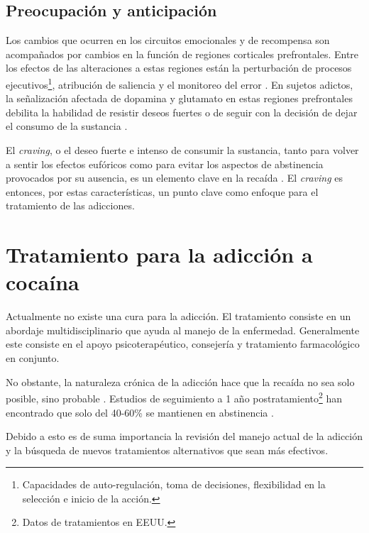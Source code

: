 \subsection{Preocupación y anticipación}
\label{crav}
Los cambios que ocurren en los circuitos emocionales y de recompensa son acompañados por cambios en la función de regiones corticales prefrontales.
Entre los efectos de las alteraciones a estas regiones están la perturbación de procesos ejecutivos\footnote{Capacidades de auto-regulación, toma de decisiones, flexibilidad en la selección e inicio de la acción.}, atribución de saliencia y el monitoreo del error \parencite{Goldstein2012a,Volkow2016}.
En sujetos adictos, la señalización afectada de dopamina y glutamato en estas regiones prefrontales debilita la habilidad de resistir deseos fuertes o de seguir con la decisión de dejar el consumo de la sustancia \parencite{Volkow2016}.\par
El \textit{craving}, o el deseo fuerte e intenso de consumir la sustancia, tanto para volver a sentir los efectos eufóricos como para evitar los aspectos de abstinencia provocados por su ausencia, es un elemento clave en la recaída \parencite{Koob2010a}.
El \textit{craving} es entonces, por estas características, un punto clave como enfoque para el tratamiento de las adicciones.

\section{Tratamiento para la adicción a cocaína}
Actualmente no existe una cura para la adicción.
El tratamiento consiste en un abordaje multidisciplinario que ayuda al manejo de la enfermedad.
Generalmente este consiste en el apoyo psicoterapéutico, consejería y tratamiento farmacológico en conjunto. \par
No obstante, la naturaleza crónica de la adicción hace que la recaída no sea solo posible, sino probable \parencite{NIDA.}.
Estudios de seguimiento a 1 año postratamiento\footnote{Datos de tratamientos en EEUU.} han encontrado que solo del 40-60\% se mantienen en abstinencia \parencite{McLellan1980}.\par
Debido a esto es de suma importancia la revisión del manejo actual de la adicción y la búsqueda de nuevos tratamientos alternativos que sean más efectivos.

